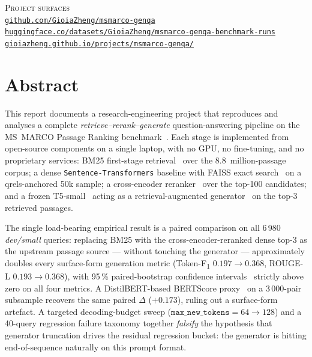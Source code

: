 \documentclass[11pt,a4paper]{article}
\newcommand{\devsmall}{\textit{dev/small}}
\newcommand{\fdev}{6\,980}
\newcommand{\msmarco}{MS~MARCO}
\newcommand{\F}{F\textsubscript{1}}
\newcommand{\Tokenf}{Token-\F}
\newcommand{\rougel}{ROUGE-L}
\newcommand{\bertscore}{BERTScore}
\newcommand{\bmtwofive}{BM25}
\newcommand{\code}[1]{\texttt{#1}}
\begin{document}
\begin{titlepage}
  \vspace{1.4cm}

  {\small\textsc{Project surfaces}\\[0.15em]
   \href{https://github.com/GioiaZheng/msmarco-genqa}%
    {\texttt{github.com/GioiaZheng/msmarco-genqa}}\\[0.12em]
   \href{https://huggingface.co/datasets/GioiaZheng/msmarco-genqa-benchmark-runs}%
    {\texttt{huggingface.co/datasets/GioiaZheng/msmarco-genqa-benchmark-runs}}\\[0.12em]
   \href{https://gioiazheng.github.io/projects/msmarco-genqa/}%
    {\texttt{gioiazheng.github.io/projects/msmarco-genqa/}}\par}

  \vspace{0.6cm}
\end{titlepage}

\newpage
\thispagestyle{empty}
\section*{Abstract}

This report documents a research-engineering project that reproduces
and analyses a complete \emph{retrieve--rerank--generate}
question-answering pipeline on the \msmarco{} Passage Ranking
benchmark~\cite{bajaj2016msmarco,nguyen2016msmarcoqa}.  Each stage is
implemented from open-source components on a single laptop, with no
GPU, no fine-tuning, and no proprietary services: \bmtwofive{}
first-stage retrieval~\cite{robertson2009bm25,lu2024bm25s} over the
8.8~million-passage corpus; a dense \texttt{Sentence-Transformers}
baseline with FAISS exact search~\cite{reimers2019sbert,johnson2019faiss}
on a qrels-anchored 50k sample; a cross-encoder
reranker~\cite{nogueira2019passage,wang2020minilm} over the top-100
candidates; and a frozen T5-small~\cite{raffel2020t5} acting as a
retrieval-augmented generator~\cite{lewis2020rag} on the top-3
retrieved passages.

The single load-bearing empirical result is a paired comparison on
all \fdev{} \devsmall{} queries: replacing \bmtwofive{} with the
cross-encoder-reranked dense top-3 as the upstream passage source ---
without touching the generator --- approximately doubles every
surface-form generation metric (\Tokenf{} $0.197 \to 0.368$, \rougel{}
$0.193 \to 0.368$), with 95\,\% paired-bootstrap
confidence intervals~\cite{koehn2004bootstrap} strictly above zero on
all four metrics.  A DistilBERT-based \bertscore{}
proxy~\cite{zhang2020bertscore,sanh2019distilbert} on a 3\,000-pair
subsample recovers the same paired $\Delta$ ($+0.173$), ruling out a
surface-form artefact.  A targeted decoding-budget sweep
($\code{max\_new\_tokens}=64\!\to\!128$) and a 40-query regression
failure taxonomy together \emph{falsify} the hypothesis that
generator truncation drives the residual regression bucket: the
generator is hitting end-of-sequence naturally on this prompt format.
\end{document}
